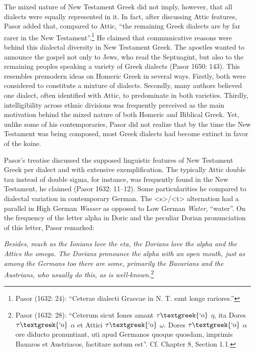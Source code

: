 \documentclass[12pt]{article}
\newenvironment{styleStandard}{\renewcommand\baselinestretch{1.25}\setlength\leftskip{0in}\setlength\rightskip{0in}\setlength\parindent{0.1972in}\setlength\parfillskip{0pt plus 1fil}\setlength\parskip{0in plus 1pt}\writerlistparindent\writerlistleftskip\leavevmode\normalfont\normalsize\writerlistlabel\ignorespaces}{\unskip\vspace{0in plus 1pt}\par}
\newenvironment{styleQuote}{\renewcommand\baselinestretch{1.25}\setlength\leftskip{0.3937in}\setlength\rightskip{0in}\setlength\parindent{0in}\setlength\parfillskip{0pt plus 1fil}\setlength\parskip{0.1665in plus 0.016649999in}\writerlistparindent\writerlistleftskip\leavevmode\normalfont\normalsize\writerlistlabel\ignorespaces}{\unskip\vspace{0.1665in plus 0.016649999in}\par}
\newcommand\writerlistleftskip{}
\newcommand\writerlistparindent{}
\newcommand\writerlistlabel{}
\begin{document}
\begin{styleStandard}
The mixed nature of New Testament Greek did not imply, however, that all dialects were equally represented in it. In fact, after discussing Attic features, Pasor added that, compared to Attic, “the remaining Greek dialects are by far rarer in the New Testament”.\footnote{ Pasor (1632: 24): “Ceterae dialecti Graecae in N. T. sunt longe rariores.”} He claimed that communicative reasons were behind this dialectal diversity in New Testament Greek. The apostles wanted to announce the gospel not only to Jews, who read the Septuagint, but also to the remaining peoples speaking a variety of Greek dialects (Pasor 1650: 143). This resembles premodern ideas on Homeric Greek in several ways. Firstly, both were considered to constitute a mixture of dialects. Secondly, many authors believed one dialect, often identified with Attic, to predominate in both varieties. Thirdly, intelligibility across ethnic divisions was frequently perceived as the main motivation behind the mixed nature of both Homeric and Biblical Greek. Yet, unlike some of his contemporaries, Pasor did not realize that by the time the New Testament was being composed, most Greek dialects had become extinct in favor of the koine.
\end{styleStandard}

\begin{styleStandard}
Pasor’s treatise discussed the supposed linguistic features of New Testament Greek per dialect and with extensive exemplification. The typically Attic double tau instead of double sigma, for instance, was frequently found in the New Testament, he claimed (Pasor 1632: 11–12). Some particularities he compared to dialectal variation in contemporary German. The {\textless}s{\textgreater}/{\textless}t{\textgreater} alternation had a parallel in High German \textit{Wasser} as opposed to Low German \textit{Water}, “water”. On the frequency of the letter alpha in Doric and the peculiar Dorian pronunciation of this letter, Pasor remarked:
\end{styleStandard}

\begin{styleQuote}
\emph{\textup{Besides, much as the Ionians love the eta, the Dorians love the alpha and the Attics the omega. The Dorians pronounce the alpha with an open mouth, just as among the Germans too there are some, primarily the Bavarians and the Austrians, who usually do this, as is well-known.}}\footnote{ Pasor (1632: 28): “Ceterum sicut Iones amant $\tau \text{\textgreek{`o}}$ $\eta $, ita Dores $\tau \text{\textgreek{`o}}$ $\alpha $ et Attici $\tau \text{\textgreek{`o}}$ $\omega $. Dores $\tau \text{\textgreek{`o}}$ $\alpha $ ore diducto pronuntiant, uti apud Germanos quoque quosdam, imprimis Bauaros et Austriacos, factitare notum est”. Cf. Chapter 8, Section 1.1.}
\end{styleQuote}
\end{document}
